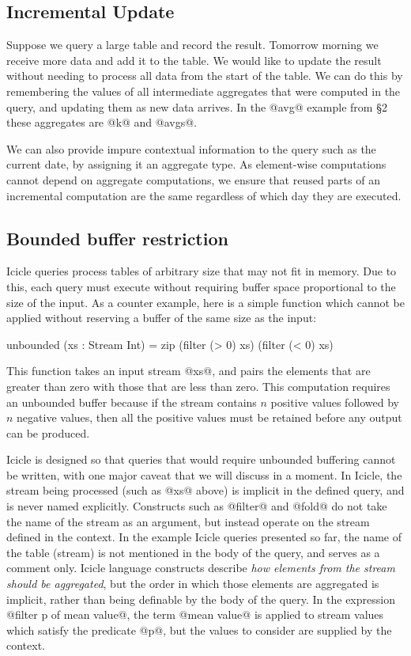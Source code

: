 \subsection{Incremental Update}
Suppose we query a large table and record the result. Tomorrow morning we receive more data and add it to the table. We would like to update the result without needing to process all data from the start of the table. We can do this by remembering the values of all intermediate aggregates that were computed in the query, and updating them as new data arrives. In the @avg@ example from \S2 these aggregates are @k@ and @avgs@. 

We can also provide impure contextual information to the query such as the current date, by assigning it an aggregate type. As element-wise computations cannot depend on aggregate computations, we ensure that reused parts of an incremental computation are the same regardless of which day they are executed.


\subsection{Bounded buffer restriction}
\label{s:IcicleSource:bounded}
Icicle queries process tables of arbitrary size that may not fit in memory. Due to this, each query must execute without requiring buffer space proportional to the size of the input. As a counter example, here is a simple function which cannot be applied without reserving a buffer of the same size as the input:
\begin{code}
    unbounded (xs : Stream Int)
     = zip (filter (> 0) xs) (filter (< 0) xs)
\end{code}

This function takes an input stream @xs@, and pairs the elements that are greater than zero with those that are less than zero.
This computation requires an unbounded buffer because if the stream contains $n$ positive values followed by $n$ negative values, then all the positive values must be retained before any output can be produced. 

Icicle is designed so that queries that would require unbounded buffering cannot be written, with one major caveat that we will discuss in a moment. In Icicle, the stream being processed (such as @xs@ above) is implicit in the defined query, and is never named explicitly. Constructs such as @filter@ and @fold@ do not take the name of the stream as an argument, but instead operate on the stream defined in the context. In the example Icicle queries presented so far, the name of the table (stream) is not mentioned in the body of the query, and serves as a comment only. Icicle language constructs describe \emph{how elements from the stream should be aggregated}, but the order in which those elements are aggregated is implicit, rather than being definable by the body of the query. In the expression @filter p of mean value@, the term @mean value@ is applied to stream values which satisfy the predicate @p@, but the values to consider are supplied by the context.

